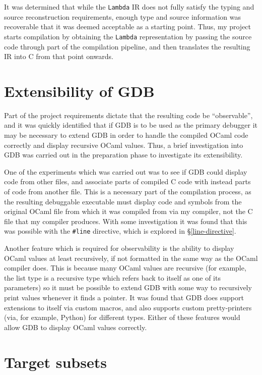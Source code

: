 It was determined that while the \texttt{Lambda} IR does not fully satisfy the
typing and source reconstruction requirements, enough type and source
information was recoverable that it was deemed acceptable as a starting point.
Thus, my project starts compilation by obtaining the \texttt{Lambda}
representation by passing the source code through part of the compilation
pipeline, and then translates the resulting IR into C from that point onwards.

\section{Extensibility of GDB}

Part of the project requirements dictate that the resulting code be 
``observable'', and it was quickly identified that if GDB is to be used as the 
primary debugger it may be necessary to extend GDB in order to handle the 
compiled OCaml code correctly and display recursive OCaml values. Thus, a brief 
investigation into GDB was carried out in the preparation phase to investigate 
its extensibility.

One of the experiments which was carried out was to see if GDB could display
code from other files, and associate parts of compiled C code with instead parts
of code from another file. This is a necessary part of the compilation process,
as the resulting debuggable executable must display code and symbols from the
original OCaml file from which it was compiled from via my compiler, not the C
file that my compiler produces. With some investigation it was found that this
was possible with the \texttt{\#}\texttt{line} directive, which is explored in
\S\ref{line-directive}.

Another feature which is required for observability is the ability to display 
OCaml values at least recursively, if not formatted in the same way as the 
OCaml compiler does. This is because many OCaml values are recursive (for 
example, the list type is a recursive type which refers back to itself as one 
of its parameters) so it must be possible to extend GDB with some way to 
recursively print values whenever it finds a pointer. It was found that GDB 
does support extensions to itself via custom macros, and also supports custom 
pretty-printers (via, for example, Python) for different types. Either of these 
features would allow GDB to display OCaml values correctly.

\section{Target subsets}

